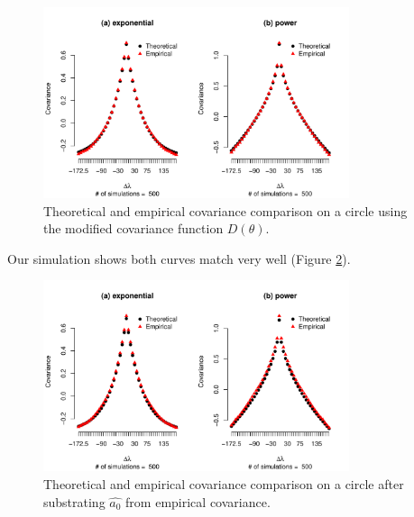 	      \begin{figure}
	      	\centering
	      	\includegraphics[width=0.8\textwidth]{graphs/covarince_circle_remove_a0}
	      	\caption[Theoretical and Empirical Covariance Comparison on a Circle Using The]{Theoretical and empirical covariance comparison on a circle using the modified covariance function $D(\theta)$.}
	      	\label{covariance_remove_a0}
	      \end{figure}


Our simulation shows both curves match very well (Figure \ref{covariance_estimate_a0}).
	
	\begin{figure}[H]
	 \centering
	 \includegraphics[width=0.8\textwidth]{graphs/covarince_circle_estimate_a0}
	 \caption[Theoretical and Empirical Covariance Comparison on a Circle After]{Theoretical and empirical covariance comparison on a circle after substrating $\hat{a_0}$ from empirical covariance.}
	 \label{covariance_estimate_a0}
	 \end{figure}


